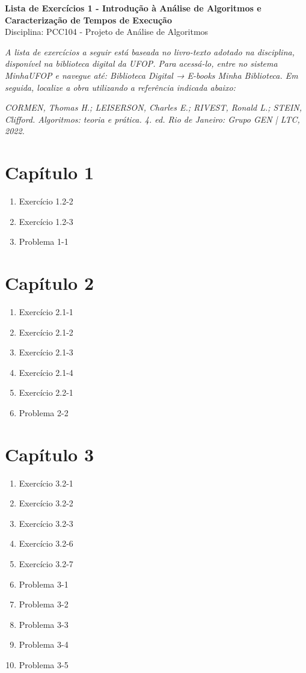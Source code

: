 \documentclass[9pt,a4paper]{extarticle}
\begin{document}
\begin{center}
  \Large \textbf{Lista de Exercícios 1 - Introdução à Análise de Algoritmos e Caracterização de Tempos de Execução} \\[4pt]
  \normalsize Disciplina: PCC104 - Projeto de Análise de Algoritmos
\end{center}

\textit{A lista de exercícios a seguir está baseada no livro-texto adotado na disciplina, disponível na biblioteca digital da UFOP. Para acessá-lo, entre no sistema MinhaUFOP e navegue até: Biblioteca Digital → E-books Minha Biblioteca. Em seguida, localize a obra utilizando a referência indicada abaixo:}

\textit{CORMEN, Thomas H.; LEISERSON, Charles E.; RIVEST, Ronald L.; STEIN, Clifford. Algoritmos: teoria e prática. 4. ed. Rio de Janeiro: Grupo GEN | LTC, 2022.}

\section*{Capítulo 1}

\begin{enumerate}[resume]
    \item Exercício 1.2-2
    \item Exercício 1.2-3
    \item Problema 1-1
\end{enumerate}

\section*{Capítulo 2}

\begin{enumerate}[resume]
    \item Exercício 2.1-1
    \item Exercício 2.1-2
    \item Exercício 2.1-3
    \item Exercício 2.1-4
    \item Exercício 2.2-1
    \item Problema 2-2
\end{enumerate}

\section*{Capítulo 3}

\begin{enumerate}[resume]
    \item Exercício 3.2-1
    \item Exercício 3.2-2
    \item Exercício 3.2-3
    \item Exercício 3.2-6
    \item Exercício 3.2-7
    \item Problema 3-1
    \item Problema 3-2
    \item Problema 3-3
    \item Problema 3-4
    \item Problema 3-5
\end{enumerate}
\end{document}
